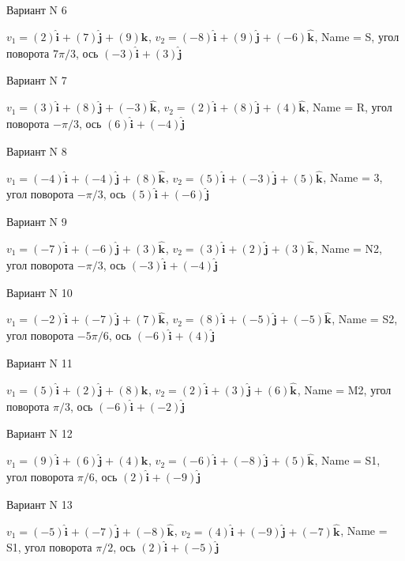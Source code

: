 \documentclass[11pt]{report}
\begin{document}
Вариант N 6

$v_1 = (2)\mathbf{\hat{i}_{}} + (7)\mathbf{\hat{j}_{}} + (9)\mathbf{\hat{k}_{}}$, $v_2 = (-8)\mathbf{\hat{i}_{}} + (9)\mathbf{\hat{j}_{}} + (-6)\mathbf{\hat{k}_{}}$, Name = S, угол поворота $7 \pi / 3$, ось $(-3)\mathbf{\hat{i}_{}} + (3)\mathbf{\hat{j}_{}}$

Вариант N 7

$v_1 = (3)\mathbf{\hat{i}_{}} + (8)\mathbf{\hat{j}_{}} + (-3)\mathbf{\hat{k}_{}}$, $v_2 = (2)\mathbf{\hat{i}_{}} + (8)\mathbf{\hat{j}_{}} + (4)\mathbf{\hat{k}_{}}$, Name = R, угол поворота $- \pi / 3$, ось $(6)\mathbf{\hat{i}_{}} + (-4)\mathbf{\hat{j}_{}}$

Вариант N 8

$v_1 = (-4)\mathbf{\hat{i}_{}} + (-4)\mathbf{\hat{j}_{}} + (8)\mathbf{\hat{k}_{}}$, $v_2 = (5)\mathbf{\hat{i}_{}} + (-3)\mathbf{\hat{j}_{}} + (5)\mathbf{\hat{k}_{}}$, Name = 3, угол поворота $- \pi / 3$, ось $(5)\mathbf{\hat{i}_{}} + (-6)\mathbf{\hat{j}_{}}$

Вариант N 9

$v_1 = (-7)\mathbf{\hat{i}_{}} + (-6)\mathbf{\hat{j}_{}} + (3)\mathbf{\hat{k}_{}}$, $v_2 = (3)\mathbf{\hat{i}_{}} + (2)\mathbf{\hat{j}_{}} + (3)\mathbf{\hat{k}_{}}$, Name = N2, угол поворота $- \pi / 3$, ось $(-3)\mathbf{\hat{i}_{}} + (-4)\mathbf{\hat{j}_{}}$

Вариант N 10

$v_1 = (-2)\mathbf{\hat{i}_{}} + (-7)\mathbf{\hat{j}_{}} + (7)\mathbf{\hat{k}_{}}$, $v_2 = (8)\mathbf{\hat{i}_{}} + (-5)\mathbf{\hat{j}_{}} + (-5)\mathbf{\hat{k}_{}}$, Name = S2, угол поворота $- 5 \pi / 6$, ось $(-6)\mathbf{\hat{i}_{}} + (4)\mathbf{\hat{j}_{}}$

Вариант N 11

$v_1 = (5)\mathbf{\hat{i}_{}} + (2)\mathbf{\hat{j}_{}} + (8)\mathbf{\hat{k}_{}}$, $v_2 = (2)\mathbf{\hat{i}_{}} + (3)\mathbf{\hat{j}_{}} + (6)\mathbf{\hat{k}_{}}$, Name = M2, угол поворота $\pi / 3$, ось $(-6)\mathbf{\hat{i}_{}} + (-2)\mathbf{\hat{j}_{}}$

Вариант N 12

$v_1 = (9)\mathbf{\hat{i}_{}} + (6)\mathbf{\hat{j}_{}} + (4)\mathbf{\hat{k}_{}}$, $v_2 = (-6)\mathbf{\hat{i}_{}} + (-8)\mathbf{\hat{j}_{}} + (5)\mathbf{\hat{k}_{}}$, Name = S1, угол поворота $\pi / 6$, ось $(2)\mathbf{\hat{i}_{}} + (-9)\mathbf{\hat{j}_{}}$

Вариант N 13

$v_1 = (-5)\mathbf{\hat{i}_{}} + (-7)\mathbf{\hat{j}_{}} + (-8)\mathbf{\hat{k}_{}}$, $v_2 = (4)\mathbf{\hat{i}_{}} + (-9)\mathbf{\hat{j}_{}} + (-7)\mathbf{\hat{k}_{}}$, Name = S1, угол поворота $\pi / 2$, ось $(2)\mathbf{\hat{i}_{}} + (-5)\mathbf{\hat{j}_{}}$
\end{document}
